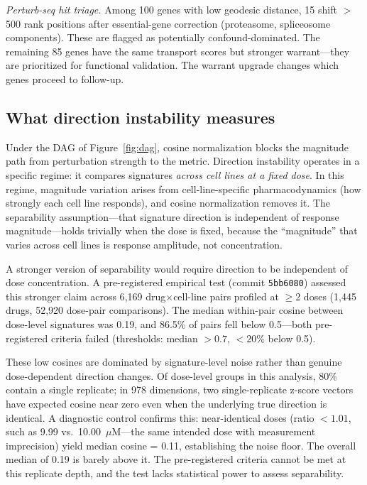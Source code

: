 \documentclass[11pt]{article}
\begin{document}
\emph{Perturb-seq hit triage.} Among 100 genes with low geodesic
distance, 15 shift $>$500 rank positions after essential-gene correction
(proteasome, spliceosome components). These are flagged as potentially
confound-dominated. The remaining 85 genes have the same transport
scores but stronger warrant---they are prioritized for functional
validation. The warrant upgrade changes which genes proceed to follow-up.

\subsection{What direction instability measures}

Under the DAG of Figure~\ref{fig:dag}, cosine normalization blocks the
magnitude path from perturbation strength to the metric. Direction
instability operates in a specific regime: it compares signatures
\emph{across cell lines at a fixed dose}. In this regime, magnitude
variation arises from cell-line-specific pharmacodynamics (how strongly
each cell line responds), and cosine normalization removes it. The
separability assumption---that signature direction is independent of
response magnitude---holds trivially when the dose is fixed, because
the ``magnitude'' that varies across cell lines is response amplitude,
not concentration.

A stronger version of separability would require direction to be
independent of dose concentration. A pre-registered empirical test
(commit \texttt{5bb6080}) assessed this stronger claim across 6{,}169
drug$\times$cell-line pairs profiled at $\geq$2 doses (1{,}445 drugs,
52{,}920 dose-pair comparisons). The median within-pair cosine between
dose-level signatures was 0.19, and 86.5\% of pairs fell below
0.5---both pre-registered criteria failed (thresholds: median $> 0.7$,
$< 20\%$ below 0.5).

These low cosines are dominated by signature-level noise rather than
genuine dose-dependent direction changes. Of dose-level groups in this
analysis, 80\% contain a single replicate; in 978 dimensions, two
single-replicate z-score vectors have expected cosine near zero even
when the underlying true direction is identical. A diagnostic control
confirms this: near-identical doses (ratio $< 1.01$, such as 9.99 vs.\
10.00~$\mu$M---the same intended dose with measurement imprecision)
yield median cosine = 0.11, establishing the noise floor. The overall
median of 0.19 is barely above it. The pre-registered criteria cannot
be met at this replicate depth, and the test lacks statistical power
to assess separability.
\end{document}
